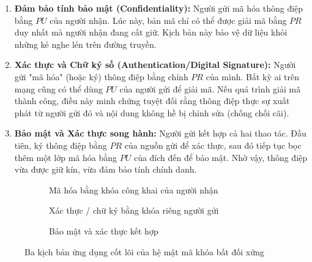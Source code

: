 \begin{enumerate}
    \item \textbf{Đảm bảo tính bảo mật (Confidentiality):} Người gửi mã hóa thông điệp bằng $PU$ của người nhận. Lúc này, bản mã chỉ có thể được giải mã bằng $PR$ duy nhất mà người nhận đang cất giữ. Kịch bản này bảo vệ dữ liệu khỏi những kẻ nghe lén trên đường truyền.
    \item \textbf{Xác thực và Chữ ký số (Authentication/Digital Signature):} Người gửi "mã hóa" (hoặc ký) thông điệp bằng chính $PR$ của mình. Bất kỳ ai trên mạng cũng có thể dùng $PU$ của người gửi để giải mã. Nếu quá trình giải mã thành công, điều này minh chứng tuyệt đối rằng thông điệp thực sự xuất phát từ người gửi đó và nội dung không hề bị chỉnh sửa (chống chối cãi).
    \item \textbf{Bảo mật và Xác thực song hành:} Người gửi kết hợp cả hai thao tác. Đầu tiên, ký thông điệp bằng $PR$ của nguồn gửi để xác thực, sau đó tiếp tục bọc thêm một lớp mã hóa bằng $PU$ của đích đến để bảo mật. Nhờ vậy, thông điệp vừa được giữ kín, vừa đảm bảo tính chính danh.
\end{enumerate}

\begin{figure}[htbp]
    \centering
    \begin{subfigure}[b]{\textwidth}
        \centering
        \caption{Mã hóa bằng khóa công khai của người nhận}
    \end{subfigure}
    \par\vspace{0.5cm}
    \begin{subfigure}[b]{\textwidth}
        \centering
        \caption{Xác thực / chữ ký bằng khóa riêng người gửi}
    \end{subfigure}
    \par\vspace{0.5cm}
    \begin{subfigure}[b]{\textwidth}
        \centering
        \caption{Bảo mật và xác thực kết hợp}
    \end{subfigure}
    \caption{Ba kịch bản ứng dụng cốt lõi của hệ mật mã khóa bất đối xứng}
    \label{fig:asymmetric_scenarios}
\end{figure}

